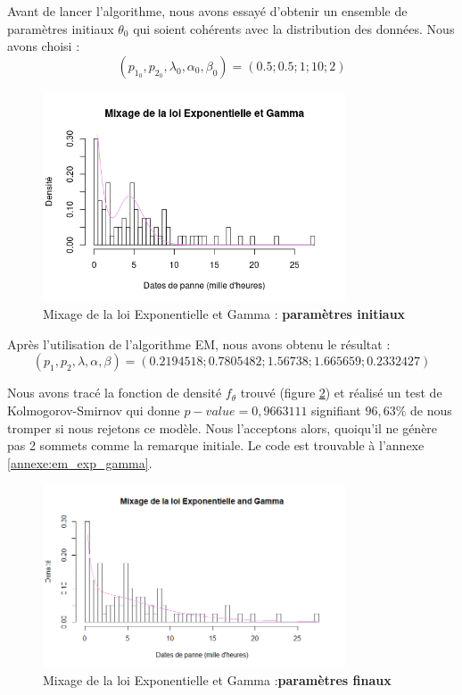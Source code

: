 \documentclass[10pt,a4paper]{article}
\begin{document}
Avant de lancer l'algorithme, nous avons essayé d'obtenir un ensemble de paramètres initiaux $\theta_{0}$
qui soient cohérents avec la distribution des données. Nous avons choisi :
\[\left( {{p_{1_0}},{p_{2_0}},\lambda_{0} ,\alpha_{0} ,\beta_{0} } \right) = \left( {0.5;0.5;1;10;2} \right)\]

\begin{figure}[!h]
    \centering
    \includegraphics[width=0.8\textwidth]{img/loi_initiale_Exp_Gamma.png}
    \caption{Mixage de la loi Exponentielle et Gamma : \textbf{paramètres initiaux}}
    \label{mixage_init}
\end{figure}

Après l'utilisation de l'algorithme EM, nous avons obtenu le résultat :
\[\left( {{p_1},{p_2},\lambda ,\alpha ,\beta } \right) = \left( {0.2194518;0.7805482;1.56738;1.665659;0.2332427} \right)\]

Nous avons tracé la fonction de densité $f_\theta$ trouvé (figure \ref{mixage}) et réalisé un test de Kolmogorov-Smirnov qui donne $p-value=0,9663111$ signifiant $96,63\%$ de nous tromper si nous rejetons ce modèle. Nous l'acceptons alors, quoiqu'il ne génère pas 2 sommets comme la remarque initiale. Le code est trouvable à l'annexe \ref{annexe:em_exp_gamma}.

\begin{figure}[!h]
    \centering
    \includegraphics[width=0.8\textwidth]{img/EM_Exp_Gamma.png}
    \caption{Mixage de la loi Exponentielle et Gamma  :\textbf{paramètres finaux}}
    \label{mixage}
\end{figure}
\end{document}
